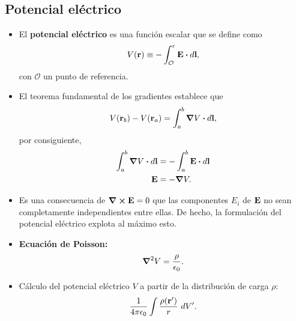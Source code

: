 \subsection{Potencial eléctrico}
\begin{itemize}
\item El \textbf{potencial eléctrico} es una función escalar que se define
como
\begin{align}
V(\vb{r})\equiv -\int_{\mathcal{O}}^r\vb{E}\vdot d\vb{l},
\end{align}
con $\mathcal{O}$ un punto de referencia.

\item El teorema fundamental de los gradientes establece que
\begin{align*}
V(\vb{r}_b)-V(\vb{r}_a)=\int_a^b \grad V\vdot d\vb{l},
\end{align*}
por consiguiente, 
\begin{align*}
\int_a^b \grad V\vdot d\vb{l}&=-\int_a^b \vb{E}\vdot d\vb{l}\\
\vb{E}&=-\grad V.
\end{align*}

\item Es una consecuencia de $\curl{\vb{E}}=0$ que las componentes
$E_i$ de $\vb{E}$ no sean completamente independientes entre ellas.
De hecho, la formulación del potencial eléctrico explota al máximo 
esto.

\item \textbf{Ecuación de Poisson:}
\begin{align}
\grad^2V=\frac{\rho}{\epsilon_0}.
\end{align}

\item Cálculo del potencial eléctrico $V$ a partir de la distribución de
carga $\rho$:
\begin{align}
\frac{1}{4\pi\epsilon_0}\int\frac{\rho(\vb{r}')}{r}\ dV'.
\end{align}


\end{itemize}
